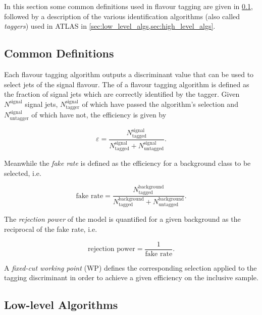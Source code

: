 In this section some common definitions used in flavour tagging are given in \cref{sec:ftag_defs}, followed by a description of the various \bjet identification algorithms (also called \textit{taggers}) used in ATLAS in \cref{sec:low_level_algs,sec:high_level_algs}.


\subsection{Common Definitions}\label{sec:ftag_defs}

Each flavour tagging algorithm outputs a discriminant value that can be used to select jets of the signal flavour.
The  of a flavour tagging algorithm is defined as the fraction of signal jets which are correctly identified by the tagger.
Given $N^{\text{signal}}$ signal jets, $N^{\text{signal}}_{\text{tagger}}$ of which have passed the algorithm's selection and $N^{\text{signal}}_{\text{untagger}}$ of which have not, the efficiency is given by

\begin{equation}
\varepsilon = \frac{N^{\text{signal}}_{\text{tagged}}}{N^{\text{signal}}_{\text{tagged}} + N^{\text{signal}}_{\text{untagged}}} .
\end{equation}

Meanwhile the \textit{fake rate} is defined as the efficiency for a background class to be selected, i.e.

\begin{equation}
\text{fake rate} = \frac{N^{\text{background}}_{\text{tagged}}}{N^{\text{background}}_{\text{tagged}} + N^{\text{background}}_{\text{untagged}}} .
\end{equation}

The \textit{rejection power} of the model is quantified for a given background as the reciprocal of the fake rate, i.e.

\begin{equation}
\text{rejection power} = \frac{1}{\text{fake rate}} .
\end{equation}

A \textit{fixed-cut working point} (WP) defines the corresponding selection applied to the tagging discriminant in order to achieve a given efficiency on the inclusive \ttbar sample.


\subsection{Low-level Algorithms}\label{sec:low_level_algs}

